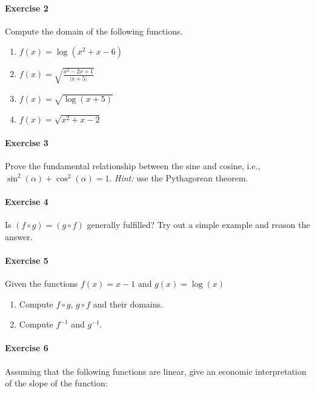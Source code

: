 \documentclass[a4paper,11pt]{article}
\theoremstyle{definition}
\theoremstyle{plain}
\begin{document}
\paragraph{Exercise 2}\label{exercise-2}

Compute the domain of the following functions.

\begin{enumerate}
\def\labelenumi{\arabic{enumi}.}
\item
  \(f(x) = \log(x^2 + x - 6)\)
\item
  \(f(x) = \sqrt{\frac{x^2-2x + 1}{\lvert x + 5 \rvert}}\)
\item
  \(f(x) = \sqrt{\log(x + 5)}\)
\item
 \(f(x) = \sqrt{x^2 + x - 2}\)
\end{enumerate}

\paragraph{Exercise 3}\label{exercise-3}
Prove the fundamental relationship between the sine and cosine, i.e., $\sin^2(\alpha)+\cos^2(\alpha) = 1$. \textit{Hint:} use the Pythagorean theorem.

\paragraph{Exercise 4}\label{exercise-4}

Is \((f\circ g) = (g \circ f)\) generally fulfilled?
Try out a simple example and reason the answer.

\paragraph{Exercise 5}\label{exercise-5}

Given the functions \(f(x) = x - 1\) and \(g(x) = \log(x)\)

\begin{enumerate}
\def\labelenumi{\arabic{enumi}.}
\item
  Compute \(f\circ g\), \(g\circ f\) and their domains.
\item
  Compute \(f^{-1}\) and \(g^{-1}\).
\end{enumerate}

\paragraph{Exercise 6}\label{exercise-6}
Assuming that the following functions are linear,
give an economic interpretation of the slope of the function:
\end{document}
